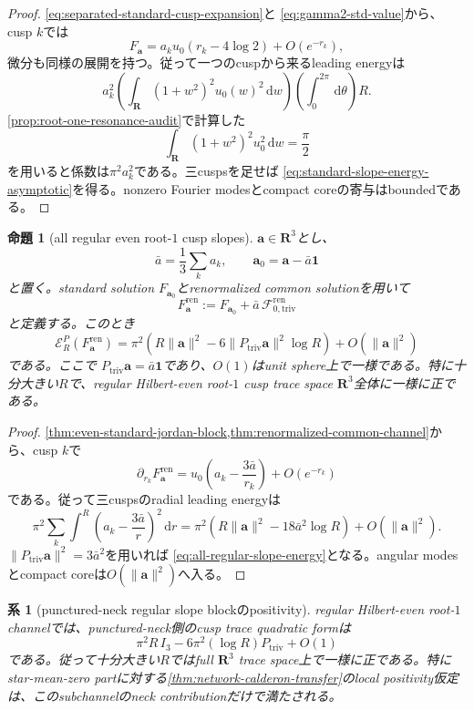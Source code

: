 \documentclass[11pt,a4paper]{ltjsarticle}
\newtheorem{proposition}[theorem]{命題}
\newtheorem{corollary}[theorem]{系}
\theoremstyle{definition}
\theoremstyle{remark}
\newcommand{\RR}{\mathbf R}
\newcommand{\dd}{\,\mathrm d}
\newcommand{\one}{\mathbf 1}
\begin{document}
\begin{proof}
\eqref{eq:separated-standard-cusp-expansion}と
\eqref{eq:gamma2-std-value}から、cusp $k$では
\[
 F_{\mathbf a}
 =a_ku_0(r_k-4\log2)+O(e^{-r_k}),
\]
微分も同様の展開を持つ。従って一つのcuspから来るleading energyは
\[
 a_k^2
 \left(\int_{\RR}(1+w^2)^2u_0(w)^2\dd w\right)
 \left(\int_0^{2\pi}\dd\theta\right)R.
\]
\cref{prop:root-one-resonance-audit}で計算した
\[
 \int_{\RR}(1+w^2)^2u_0^2\dd w=\frac\pi2
\]
を用いると係数は$\pi^2a_k^2$である。三cuspsを足せば
\eqref{eq:standard-slope-energy-asymptotic}を得る。nonzero Fourier modesとcompact coreの寄与はboundedである。
\end{proof}

\begin{proposition}[all regular even root-$1$ cusp slopes]\label{prop:all-regular-slope-energy}
$\mathbf a\in\RR^3$とし、
\[
 \bar a=\frac13\sum_ka_k,
 \qquad
 \mathbf a_0=\mathbf a-\bar a\one
\]
と置く。standard solution $F_{\mathbf a_0}$とrenormalized common solutionを用いて
\[
 F_{\mathbf a}^{\mathrm{ren}}
 :=F_{\mathbf a_0}
   +\bar a\,\mathcal F_{0,\mathrm{triv}}^{\mathrm{ren}}
\]
と定義する。このとき
\begin{equation}\label{eq:all-regular-slope-energy}
 \boxed{
 \mathcal E_R^P(F_{\mathbf a}^{\mathrm{ren}})
 =\pi^2\left(
 R\|\mathbf a\|^2
 -6\|P_{\mathrm{triv}}\mathbf a\|^2\log R
 \right)
 +O(\|\mathbf a\|^2)
 }
\end{equation}
である。ここで
$P_{\mathrm{triv}}\mathbf a=\bar a\one$であり、$O(1)$はunit sphere上で一様である。特に十分大きい$R$で、regular Hilbert-even root-$1$ cusp trace space $\RR^3$全体に一様に正である。
\end{proposition}

\begin{proof}
\cref{thm:even-standard-jordan-block,thm:renormalized-common-channel}から、cusp $k$で
\[
 \partial_{r_k}F_{\mathbf a}^{\mathrm{ren}}
 =u_0\left(a_k-\frac{3\bar a}{r_k}\right)
  +O(e^{-r_k})
\]
である。従って三cuspsのradial leading energyは
\[
 \pi^2\sum_k\int^{R}
 \left(a_k-\frac{3\bar a}{r}\right)^2\dd r
 =\pi^2\left(
 R\|\mathbf a\|^2-18\bar a^2\log R
 \right)+O(\|\mathbf a\|^2).
\]
$\|P_{\mathrm{triv}}\mathbf a\|^2=3\bar a^2$を用いれば
\eqref{eq:all-regular-slope-energy}となる。angular modesとcompact coreは$O(\|\mathbf a\|^2)$へ入る。
\end{proof}

\begin{corollary}[punctured-neck regular slope blockのpositivity]
\label{cor:neck-standard-slope-positivity}
regular Hilbert-even root-$1$ channelでは、punctured-neck側のcusp trace quadratic formは
\[
 \pi^2R\,I_3
 -6\pi^2(\log R)P_{\mathrm{triv}}
 +O(1)
\]
である。従って十分大きい$R$ではfull $\RR^3$ trace space上で一様に正である。特にstar-mean-zero partに対する\cref{thm:network-calderon-transfer}のlocal positivity仮定は、このsubchannelのneck contributionだけで満たされる。
\end{corollary}
\end{document}

